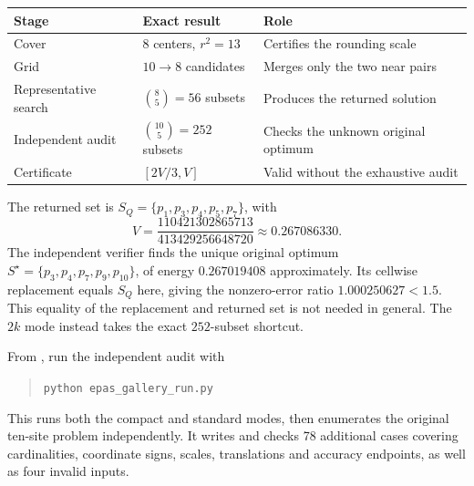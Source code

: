 \documentclass[a4paper,12pt]{article}
\numberwithin{equation}{section}
\begin{document}
\begin{center}\small
\begin{tabular}{@{}lll@{}}\toprule
Stage & Exact result & Role\\\midrule
Cover & $8$ centers, $r^2=13$ & Certifies the rounding scale\\
Grid & $10\to8$ candidates & Merges only the two near pairs\\
Representative search & $\binom85=56$ subsets & Produces the returned solution\\
Independent audit & $\binom{10}5=252$ subsets & Checks the unknown original optimum\\
Certificate & $[2V/3,V]$ & Valid without the exhaustive audit\\\bottomrule
\end{tabular}
\end{center}
The returned set is $S_Q=\{p_1,p_3,p_4,p_5,p_7\}$, with
\[
V=\frac{110421302865713}{413429256648720}\approx 0.267086330.
\]
The independent verifier finds the unique original optimum $S^\star=\{p_3,p_4,p_7,p_9,p_{10}\}$,
of energy $0.267019408$ approximately. Its cellwise replacement equals $S_Q$ here, giving the
nonzero-error ratio $1.000250627<1.5$. This equality of the replacement and returned set is not
needed in general. The $2k$ mode instead takes the exact $252$-subset shortcut.

From , run the independent audit with
\begin{quote}
\verb|python epas_gallery_run.py|
\end{quote}
This runs both the compact and standard modes, then enumerates the original
ten-site problem independently. It writes  and checks
78 additional cases covering cardinalities, coordinate signs, scales, translations and
accuracy endpoints, as well as four invalid inputs.
\end{document}
